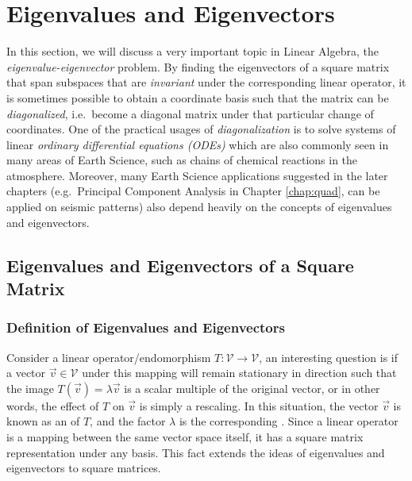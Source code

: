 \chapter{Eigenvalues and Eigenvectors}
\label{chap:eigen}

In this section, we will discuss a very important topic in Linear Algebra, the \textit{eigenvalue-eigenvector} problem. By finding the eigenvectors of a square matrix that span subspaces that are \textit{invariant} under the corresponding linear operator, it is sometimes possible to obtain a coordinate basis such that the matrix can be \textit{diagonalized}, i.e.\ become a diagonal matrix under that particular change of coordinates. One of the practical usages of \textit{diagonalization} is to solve systems of linear \textit{ordinary differential equations (ODEs)} which are also commonly seen in many areas of Earth Science, such as chains of chemical reactions in the atmosphere. Moreover, many Earth Science applications suggested in the later chapters (e.g.\ Principal Component Analysis in Chapter \ref{chap:quad}, can be applied on seismic patterns) also depend heavily on the concepts of eigenvalues and eigenvectors.

\section{Eigenvalues and Eigenvectors of a Square Matrix}
\label{section:eigensection}

\subsection{Definition of Eigenvalues and Eigenvectors}

Consider a linear operator/endomorphism $T: \mathcal{V} \to \mathcal{V}$, an interesting question is if a vector $\vec{v} \in \mathcal{V}$ under this mapping will remain stationary in direction such that the image $T(\vec{v}) = \lambda \vec{v}$ is a scalar multiple of the original vector, or in other words, the effect of $T$ on $\vec{v}$ is simply a rescaling. In this situation, the vector $\vec{v}$ is known as an  of $T$, and the factor $\lambda$ is the corresponding . Since a linear operator is a mapping between the same vector space itself, it has a square matrix representation under any basis. This fact extends the ideas of eigenvalues and eigenvectors to square matrices.

